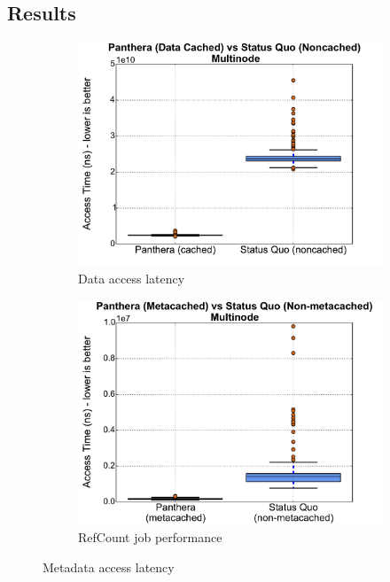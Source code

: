 \documentclass[12pt]{article}
\begin{document}
\subsection{Results}
\begin{figure}
\centering
\begin{subfigure}{.5\textwidth}
  \centering
  \includegraphics[scale=0.3]{assets/v2/getter_boxplot.pdf}
  \caption{Data access latency}
  \label{data}
\end{subfigure}%
\begin{subfigure}{.5\textwidth}
  \centering
  \includegraphics[scale=0.3]{assets/v2/multinode_meta_box_plot.pdf}
  \caption{RefCount job performance}
  \label{meta}
\end{subfigure}
\caption{Metadata access latency}
\label{fig:test}
\end{figure}
\end{document}

